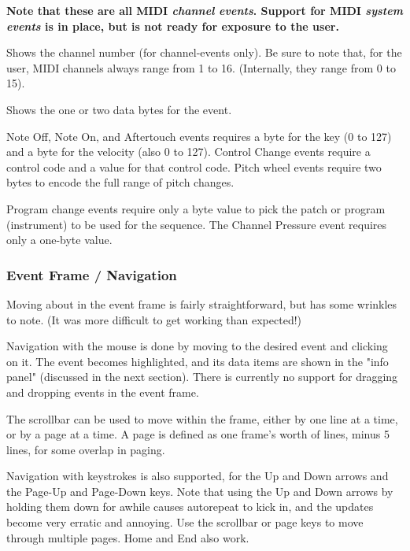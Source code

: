    \textbf{Note that these are all MIDI \textsl{channel events}.
   Support for MIDI \textsl{system events} is in place, but is not
   ready for exposure to the user.}

   Shows the channel number (for channel-events only).
   Be sure to note that, for the user, MIDI channels always range from
   1 to 16.  (Internally, they range from 0 to 15).

   Shows the one or two data bytes for the event.

   Note Off, Note On, and Aftertouch events requires a byte for the key (0 to
   127) and a byte for the velocity (also 0 to 127).
   Control Change events require a control code and a value for that control
   code.  Pitch wheel events require two bytes to encode the full range of
   pitch changes.

   Program change events require only a byte value to pick the patch or program
   (instrument) to be used for the sequence.  The Channel Pressure event
   requires only a one-byte value.

\subsubsection{Event Frame / Navigation}
\label{subsec:seq64_event_frame_navigation}

   Moving about in the event frame is fairly straightforward, but has some
   wrinkles to note.  (It was more difficult to get working than expected!)

   Navigation with the mouse is done by moving to the desired event and
   clicking on it.  The event becomes highlighted, and its data items are shown
   in the "info panel" (discussed in the next section).
   There is currently no support for dragging and dropping events in the event
   frame.

   The scrollbar can be used to move within the frame, either by one line at a
   time, or by a page at a time.  A page is defined as one frame's worth of
   lines, minus 5 lines, for some overlap in paging.

   Navigation with keystrokes is also supported, for the Up and Down arrows and
   the Page-Up and Page-Down keys.  Note that using the Up and Down arrows by
   holding them down for awhile causes autorepeat to kick in, and the updates
   become very erratic and annoying.  Use the scrollbar or page keys to
   move through multiple pages.  Home and End also work.

